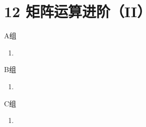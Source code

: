\section*{12 矩阵运算进阶（II）}

\vspace{2ex}

\centerline{\heiti A组}
\begin{enumerate}
    \item
\end{enumerate}

\centerline{\heiti B组}
\begin{enumerate}
    \item
\end{enumerate}

\centerline{\heiti C组}
\begin{enumerate}
    \item
\end{enumerate}

\clearpage
